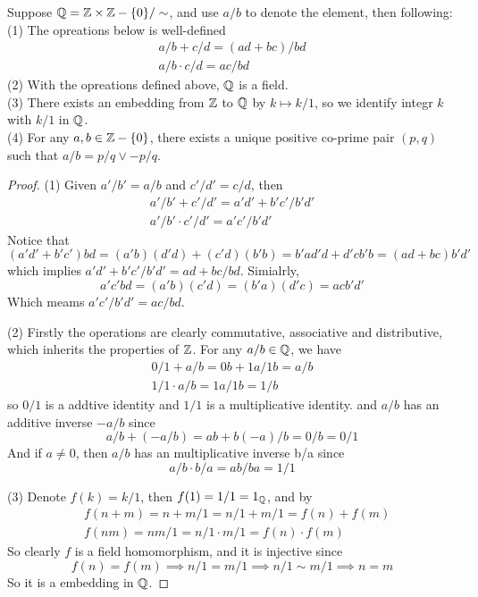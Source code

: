 \documentclass[en,geye,blue,normal,12pt]{elegantnote}
\begin{document}
\begin{proposition}
  Suppose \(\mathbb{Q} = \mathbb{Z}\times \mathbb{Z}-\{0\} /\sim\), and use \(a/b\) to denote the element, then following:
  \\(1) The opreations below is well-defined
  \begin{align*}
    a/b+c/d  = (ad + bc) /bd\\
    a/b \cdot c/d = ac/bd
  \end{align*}
  (2) With the opreations defined above, \(\mathbb{Q}\) is a field.
  \\(3) There exists an embedding from \(\mathbb{Z}\) to \(\mathbb{Q}\) by \(k \mapsto k/1\), so we identify integr \(k\) with \(k/1\) in \(\mathbb{Q}\).
  \\(4) For any \(a,b \in \mathbb{Z}-\{0\}\), there exists a unique positive co-prime pair \((p,q)\) such that \(a/b = p/q \lor -p/q \). 

  \begin{proof}
    (1) Given \(a'/b' = a/b\) and \(c'/d' = c/d \), then 
    \begin{align*}
      a'/b'+c'/d'  = a'd' + b'c' /b'd'\\
      a'/b' \cdot c'/d' = a'c'/b'd'
    \end{align*}
    Notice that \[(a'd'+b'c')bd = (a'b)(d'd)+(c'd)(b'b) = b'ad'd+d'cb'b=(ad+bc)b'd'\] which implies \(a'd'+b'c'/b'd' = ad+bc/bd\). Simialrly, \[a'c'bd = (a'b)(c'd) = (b'a)(d'c)  = acb'd'\]
    Which meams \(a'c'/b'd' = ac/bd\).

    (2) Firstly the operations are clearly commutative, associative and distributive, which inherits the properties of \(\mathbb{Z} \). For any \(a/b \in \mathbb{Q}\), we have \begin{align*}
      0/1+a/b = 0b+1a/1b = a/b \\
      1/1 \cdot a/b =1a/1b = 1/b
    \end{align*}
    so \(0/1\) is a addtive identity and \(1/1\) is a multiplicative identity. and \(a/b\) has an additive inverse \(-a/b\) since
    \[a/b+(-a/b) = ab+b(-a)/b = 0/b = 0/1\]
    And if \(a \neq 0\), then \(a/b\) has an multiplicative inverse b/a since
    \[a/b \cdot b/a = ab/ba = 1/1\]

    (3) Denote \(f(k) = k/1\), then \(f(1) = 1/1 = 1_{\mathbb{Q}}\), and by
    \begin{align*}
      &f(n+m) = n+m/1 = n/1 +m/1 = f(n)+f(m) \\
      &f(nm) = nm/1 = n/1\cdot m/1 = f(n)\cdot f(m) 
    \end{align*}
    So clearly \(f\) is a field homomorphism, and it is injective since
    \[f(n) = f(m) \implies n/1 =m/1 \implies n/1 \sim m/1 \implies n = m\]
    So it is a embedding in \(\mathbb{Q}\).


\end{proof}
\end{proposition}
\end{document}
